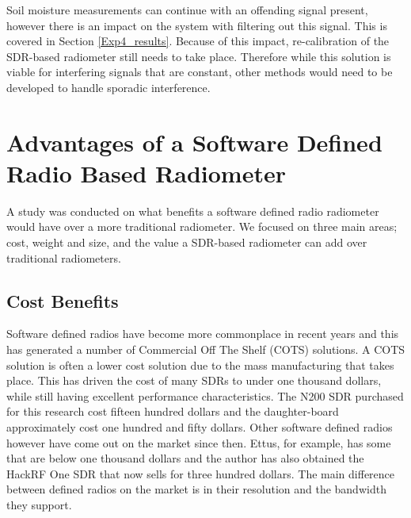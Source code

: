 {Soil moisture measurements can continue with an offending signal present, however there is an impact on the system with filtering out this signal.  This is covered in Section \ref{Exp4_results}.  Because of this impact, re-calibration of the SDR-based radiometer still needs to take place.  Therefore while this solution is viable for interfering signals that are constant, other methods would need to be developed to handle sporadic interference.  


\section{Advantages of a Software Defined Radio Based Radiometer}
A study was conducted on what benefits a software defined radio radiometer would have over a more traditional radiometer.  We focused on three main areas; cost, weight and size, and the value a SDR-based radiometer can add over traditional radiometers.

\subsection{Cost Benefits}
Software defined radios have become more commonplace in recent years and this has generated a number of Commercial Off The Shelf (COTS) solutions.  A COTS solution is often a lower cost solution due to the mass manufacturing that takes place.  This has driven the cost of many SDRs to under one thousand dollars, while still having excellent performance characteristics.  The N200 SDR purchased for this research cost fifteen hundred dollars and the daughter-board approximately cost one hundred and fifty dollars.  Other software defined radios however have come out on the market since then.  Ettus, for example, has some that are below one thousand dollars and the author has also obtained the HackRF One SDR that now sells for three hundred dollars.  The main difference between defined radios on the market is in their resolution and the bandwidth they support.

}
